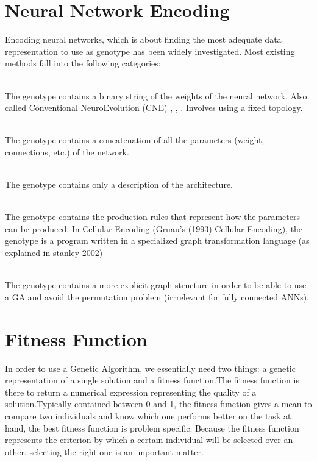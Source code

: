 \documentclass[a4paper,12pt, oneside]{memoir}
\begin{document}
\section{Neural Network Encoding}

Encoding neural networks, which is about finding the most adequate data representation to use as genotype has been widely investigated. Most existing methods fall into the following categories:
\begin{description}
  \setlength\itemsep{0.001em}
  \item[Binary Encoding scheme] \hfill \\
    The genotype contains a binary string of the weights of the neural network. Also called Conventional NeuroEvolution (CNE) \cite{schaffer-1990}, \cite{floreano-2008}, \cite{yao-1999}. Involves using a fixed topology.
  \item[Direct Encoding or Real Number Encoding scheme] \hfill \\
    The genotype contains a concatenation of all the parameters (weight, connections, etc.) of the network.
  \item[Indirect encoding scheme] \hfill \\
    The genotype contains only a description of the architecture.
  \item[Development Rule Represention scheme] \hfill \\ 
    The genotype contains the production rules that represent how the parameters can be produced. In Cellular Encoding (Gruau’s (1993) Cellular Encoding), the genotype is a program written in a specialized graph transformation language (as explained in stanley-2002)
  \item[Graph encoding scheme] \hfill \\
    The genotype contains a more explicit graph-structure in order to be able to use a GA and avoid the permutation problem (irrrelevant for fully connected ANNs).
\end{description}

\section{Fitness Function}
In order to use a Genetic Algorithm, we essentially need two things: a genetic representation of a single solution and a fitness function.The fitness function is there to return a numerical expression representing the quality of a solution.Typically contained between 0 and 1, the fitness function gives a mean to compare two individuals and know which one performs better on the task at hand, the best fitness function is problem specific. Because the fitness function represents the criterion by which a certain individual will be selected over an other, selecting the right one is an important matter. 
\end{document}
